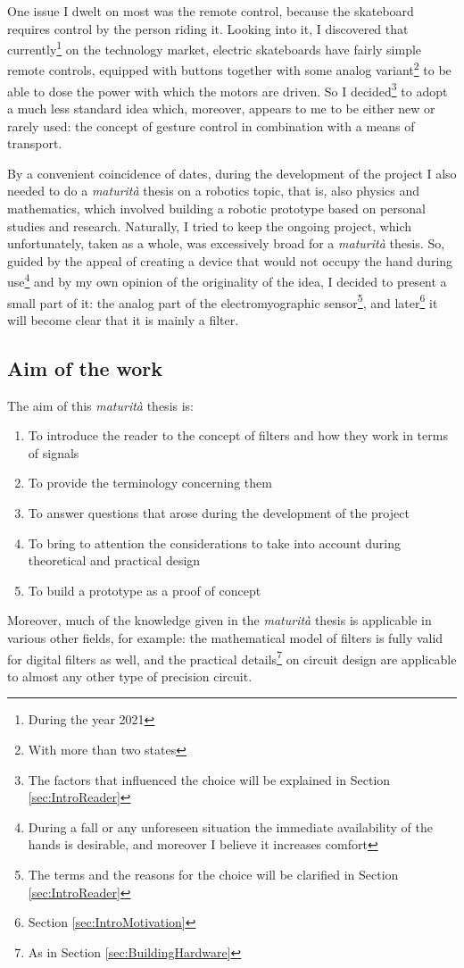 \documentclass[a4paper, 10pt, final]{article} %
\begin{document}
    One issue I dwelt on most was the remote control, because the skateboard requires control by the person riding it.
    Looking into it, I discovered that currently\footnote{During the year 2021} on the technology market, electric skateboards have fairly simple remote controls, equipped with buttons together with some analog variant\footnote{With more than two states} to be able to dose the power with which the motors are driven.
    So I decided\footnote{The factors that influenced the choice will be explained in Section \ref{sec:IntroReader}} to adopt a much less standard idea which, moreover, appears to me to be either new or rarely used: the concept of gesture control in combination with a means of transport.
    
    By a convenient coincidence of dates, during the development of the project I also needed to do a \emph{maturit\`{a}} thesis on a robotics topic, that is, also physics and mathematics, which involved building a robotic prototype based on personal studies and research. Naturally, I tried to keep the ongoing project, which unfortunately, taken as a whole, was excessively broad for a \emph{maturit\`{a}} thesis. So, guided by the appeal of creating a device that would not occupy the hand during use\footnote{During a fall or any unforeseen situation the immediate availability of the hands is desirable, and moreover I believe it increases comfort} and by my own opinion of the originality of the idea, I decided to present a small part of it: the analog part of the electromyographic sensor\footnote{The terms and the reasons for the choice will be clarified in Section \ref{sec:IntroReader}}, and later\footnote{Section \ref{sec:IntroMotivation}} it will become clear that it is mainly a filter.
    
    \subsection{Aim of the work}\label{sec:IntroAim}
    \noindent The aim of this \emph{maturit\`{a}} thesis is:
    \begin{enumerate}[label=\emph{(\roman*)}]
        \item To introduce the reader to the concept of filters and how they work in terms of signals
        \item To provide the terminology concerning them
        \item To answer questions that arose during the development of the project
        \item To bring to attention the considerations to take into account during theoretical and practical design
        \item To build a prototype as a proof of concept
    \end{enumerate}
    Moreover, much of the knowledge given in the \emph{maturit\`{a}} thesis is applicable in various other fields, for example: the mathematical model of filters is fully valid for digital filters as well, and the practical details\footnote{As in Section \ref{sec:BuildingHardware}}  on circuit design are applicable to almost any other type of precision circuit.
    
\end{document}
